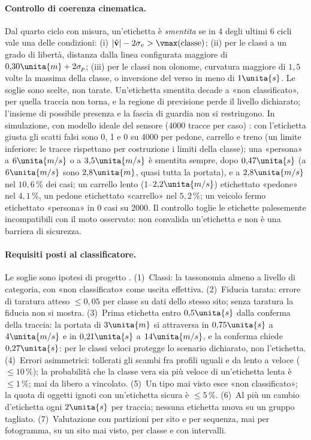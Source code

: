 \paragraph{Controllo di coerenza cinematica.} Dal quarto ciclo con misura, un'etichetta è \emph{smentita} se in 4 degli ultimi 6 cicli vale una delle condizioni: (i) $|\hat{\mathbf v}|-2\sigma_v>\vmax(\text{classe})$; (ii) per le classi a un grado di libertà, distanza dalla linea configurata maggiore di $0{,}30\unita{m}+2\sigma_p$; (iii) per le classi non olonome, curvatura maggiore di $1{,}5$ volte la massima della classe, o inversione del verso in meno di $1\unita{s}$. Le soglie sono scelte, non tarate. Un'etichetta smentita decade a «non classificato», per quella traccia non torna, e la regione di previsione perde il livello dichiarato; l'insieme di possibile presenza e la fascia di guardia non si restringono. In simulazione, con modello ideale del sensore (4000 tracce per caso) : con l'etichetta giusta gli scatti falsi sono 0, 1 e 0 su 4000 per pedone, carrello e treno (un limite inferiore: le tracce rispettano per costruzione i limiti della classe); una «persona» a $6\unita{m/s}$ o a $3{,}5\unita{m/s}$ è smentita sempre, dopo $0{,}47\unita{s}$ (a $6\unita{m/s}$ sono $2{,}8\unita{m}$, quasi tutta la portata), e a $2{,}8\unita{m/s}$ nel $10{,}6\,\%$ dei casi; un carrello lento (1--$2{,}2\unita{m/s}$) etichettato «pedone» nel $4{,}1\,\%$, un pedone etichettato «carrello» nel $5{,}2\,\%$; un veicolo fermo etichettato «persona» in 0 casi su 2000. Il controllo toglie le etichette palesemente incompatibili con il moto osservato: non convalida un'etichetta e non è una barriera di sicurezza.

\paragraph{Requisiti posti al classificatore.} Le soglie sono ipotesi di progetto . (1)~Classi: la tassonomia almeno a livello di categoria, con «non classificato» come uscita effettiva. (2)~Fiducia tarata: errore di taratura atteso $\le0{,}05$ per classe su dati dello stesso sito; senza taratura la fiducia non si mostra. (3)~Prima etichetta entro $0{,}5\unita{s}$ dalla conferma della traccia: la portata di $3\unita{m}$ si attraversa in $0{,}75\unita{s}$ a $4\unita{m/s}$ e in $0{,}21\unita{s}$ a $14\unita{m/s}$, e la conferma chiede $0{,}27\unita{s}$: per le classi veloci protegge lo scenario dichiarato, non l'etichetta. (4)~Errori asimmetrici: tollerati gli scambi fra profili uguali e da lento a veloce ($\le10\,\%$); la probabilità che la classe vera sia più veloce di un'etichetta lenta è $\le1\,\%$; mai da libero a vincolato. (5)~Un tipo mai visto esce «non classificato»; la quota di oggetti ignoti con un'etichetta sicura è $\le5\,\%$. (6)~Al più un cambio d'etichetta ogni $2\unita{s}$ per traccia; nessuna etichetta nuova su un gruppo tagliato. (7)~Valutazione con partizioni per sito e per sequenza, mai per fotogramma, su un sito mai visto, per classe e con intervalli.

